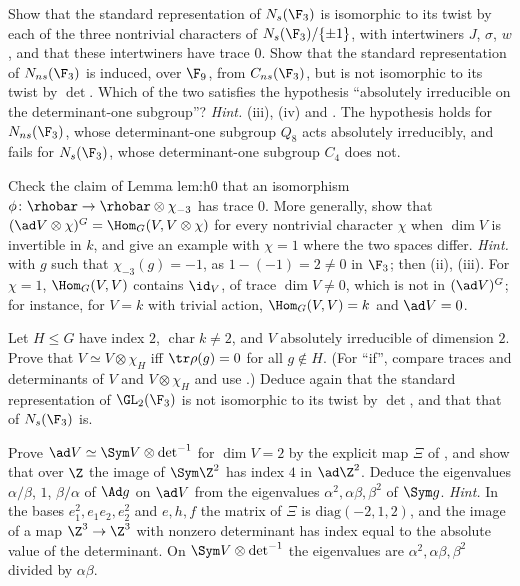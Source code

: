 \begin{exercise}\label{ex:reps:ex7}
Show that the standard representation of $N_s(\F_3)$ is isomorphic to its twist by each of the three nontrivial characters of $N_s(\F_3)/\{\pm1\}$, with
intertwiners $J$, $\sigma$, $w$, and that these intertwiners have trace $0$. Show that the standard representation of $N_{ns}(\F_3)$ is induced, over $\F_9$,
from $C_{ns}(\F_3)$, but is not isomorphic to its twist by $\det$. Which of the two satisfies the hypothesis ``absolutely irreducible on the
determinant-one subgroup''?
\emph{Hint.} (iii), (iv) and . The hypothesis holds for $N_{ns}(\F_3)$, whose
determinant-one subgroup $Q_8$ acts absolutely irreducibly, and fails for $N_s(\F_3)$, whose determinant-one subgroup $C_4$ does not.
\end{exercise}

\begin{exercise}\label{ex:reps:ex8}
Check the claim of Lemma lem:h0 that an isomorphism $\phi\colon\rhobar\to\rhobar\otimes\chi_{-3}$ has trace $0$. More generally, show that
$(\ad V\otimes\chi)^G=\Hom_G(V,V\otimes\chi)$ for every nontrivial character $\chi$ when $\dim V$ is invertible in $k$, and give an example with $\chi=1$ where the
two spaces differ.
\emph{Hint.}  with $g$ such that $\chi_{-3}(g)=-1$, as $1-(-1)=2\ne0$ in $\F_3$; then
(ii), (iii). For $\chi=1$, $\Hom_G(V,V)$ contains $\id_V$, of trace $\dim V\ne0$, which is not in $(\ad V)^G$; for
instance, for $V=k$ with trivial action, $\Hom_G(V,V)=k$ and $\ad V=0$.
\end{exercise}

\begin{exercise}\label{ex:reps:ex9}
Let $H\le G$ have index $2$, $\operatorname{char}k\ne2$, and $V$ absolutely irreducible of dimension $2$. Prove that $V\simeq V\otimes\chi_H$ iff $\tr\rho(g)=0$ for all
$g\notin H$. (For ``if'', compare traces and determinants of $V$ and $V\otimes\chi_H$ and use .) Deduce again that the
standard representation of $\GL_2(\F_3)$ is not isomorphic to its twist by $\det$, and that that of $N_s(\F_3)$ is.
\end{exercise}

\begin{exercise}\label{ex:reps:ex10}
Prove $\ad V\simeq\Sym V\otimes\det^{-1}$ for $\dim V=2$ by the explicit map $\Xi$ of , and show that over $\Z$ the image of $\Sym\Z^2$ has index
$4$ in $\ad\Z^2$. Deduce the eigenvalues $\alpha/\beta$, $1$, $\beta/\alpha$ of $\Ad g$ on $\ad V$ from the eigenvalues $\alpha^2,\alpha\beta,\beta^2$ of $\Sym g$.
\emph{Hint.} In the bases $e_1^2,e_1e_2,e_2^2$ and $e,h,f$ the matrix of $\Xi$ is $\mathrm{diag}(-2,1,2)$, and the image of a map $\Z^3\to\Z^3$ with
nonzero determinant has index equal to the absolute value of the determinant. On $\Sym V\otimes\det^{-1}$ the eigenvalues are $\alpha^2,\alpha\beta,\beta^2$
divided by $\alpha\beta$.
\end{exercise}

